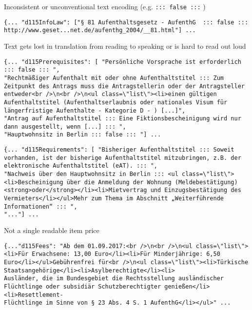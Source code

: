 Inconsistent or unconventional text encoding (e.g. \texttt{::: false :::} )
\begin{verbatim}
{... "d115InfoLaw": ["§ 81 Aufenthaltsgesetz - AufenthG  ::: false ::: http://www.geset...net.de/aufenthg_2004/__81.html"] ...
\end{verbatim}

Text gets lost in translation from reading to speaking or is hard to read out loud
\begin{verbatim}
{... "d115Prerequisites": [ "Persönliche Vorsprache ist erforderlich ::: false ::: ",
"Rechtmäßiger Aufenthalt mit oder ohne Aufenthaltstitel ::: Zum Zeitpunkt des Antrags muss die Antragstellerin oder der Antragsteller entweder<br />\n<br />\n<ul class=\"list\"><li>einen gültigen Aufenthaltstitel (Aufenthaltserlaubnis oder nationales Visum für längerfristige Aufenthalte - Kategorie D - ) [...]",
"Antrag auf Aufenthaltstitel ::: Eine Fiktionsbescheinigung wird nur dann ausgestellt, wenn [...] ::: ",
"Hauptwohnsitz in Berlin ::: false ::: "] ...
\end{verbatim}

\begin{verbatim}
{... "d115Requirements": [ "Bisheriger Aufenthaltstitel ::: Soweit vorhanden, ist der bisherige Aufenthaltstitel mitzubringen, z.B. der elektronische Aufenthaltstitel (eAT). ::: ",
"Nachweis über den Hauptwohnsitz in Berlin ::: <ul class=\"list\"><li>Bescheinigung über die Anmeldung der Wohnung (Meldebestätigung) <strong>oder</strong></li><li>Mietvertrag und Einzugsbestätigung des Vermieters</li></ul>Mehr zum Thema im Abschnitt „Weiterführende Informationen“ ::: ",
"..."] ...
\end{verbatim}

Not a single readable item price
\begin{verbatim}
{..."d115Fees": "Ab dem 01.09.2017:<br />\n<br />\n<ul class=\"list\"><li>Für Erwachsene: 13,00 Euro</li><li>Für Minderjährige: 6,50 Euro</li></ul>Gebührenfrei für<br />\n<ul class=\"list\"><li>Türkische Staatsangehörige</li><li>Asylberechtigte</li><li>
Ausländer, die im Bundesgebiet die Rechtsstellung ausländischer Flüchtlinge oder subsidiär Schutzberechtigter genießen</li><li>Resettlement-
Flüchtlinge im Sinne von § 23 Abs. 4 S. 1 AufenthG</li></ul>" ...
\end{verbatim}

